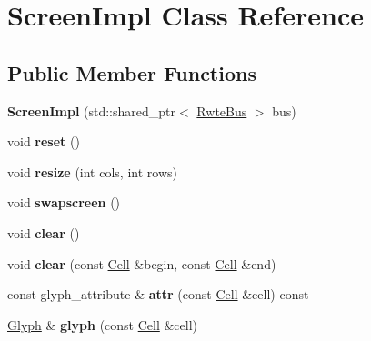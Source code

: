 \hypertarget{classScreenImpl}{}\section{Screen\+Impl Class Reference}
\label{classScreenImpl}
\subsection*{Public Member Functions}
\begin{DoxyCompactItemize}
\item 
\mbox{\label{classScreenImpl_a0c09542e8bea5061d002b550e229c51a}} 
{\bfseries Screen\+Impl} (std\+::shared\+\_\+ptr$<$ \mbox{\hyperlink{classBus}{Rwte\+Bus}} $>$ bus)
\item 
\mbox{\label{classScreenImpl_a617bb86577222e80ff2a6fd6a20963c5}} 
void {\bfseries reset} ()
\item 
\mbox{\label{classScreenImpl_aadbbe6e5435559b2aba7e0902b0d72a7}} 
void {\bfseries resize} (int cols, int rows)
\item 
\mbox{\label{classScreenImpl_a0881614390cb71b4a3689af144456425}} 
void {\bfseries swapscreen} ()
\item 
\mbox{\label{classScreenImpl_a8bfc60507cd240f6c61285fd53e5f060}} 
void {\bfseries clear} ()
\item 
\mbox{\label{classScreenImpl_a6ade64b1493013adb9a01e45a3cf73b6}} 
void {\bfseries clear} (const \mbox{\hyperlink{structCell}{Cell}} \&begin, const \mbox{\hyperlink{structCell}{Cell}} \&end)
\item 
\mbox{\label{classScreenImpl_a94bbeb84b6908d0d7bf111ccfee7efd6}} 
const glyph\+\_\+attribute \& {\bfseries attr} (const \mbox{\hyperlink{structCell}{Cell}} \&cell) const
\item 
\mbox{\label{classScreenImpl_aade9bf072c041f6adf57f49d0f852356}} 
\mbox{\hyperlink{structGlyph}{Glyph}} \& {\bfseries glyph} (const \mbox{\hyperlink{structCell}{Cell}} \&cell)
\item 
\mbox{\label{classScreenImpl_acb61d8624d90b08319cb7593c8842c42}} 

\end{DoxyCompactItemize}
